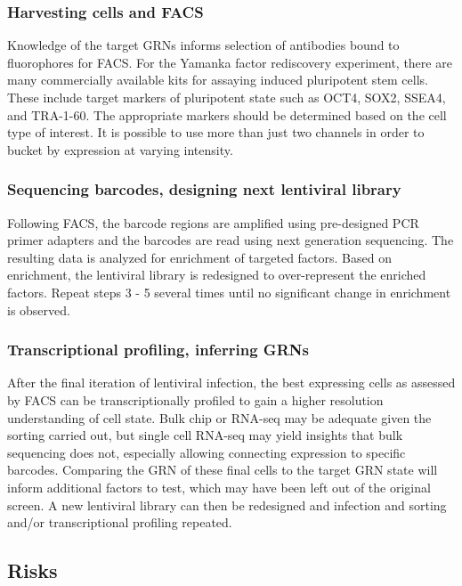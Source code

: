 \documentclass[10pt]{article}
\begin{document}
\subsubsection{Harvesting cells and FACS}

Knowledge of the target GRNs informs selection of antibodies bound to fluorophores for FACS. For the Yamanka factor rediscovery experiment, there are many commercially available kits for assaying induced pluripotent stem cells. These include target markers of pluripotent state such as OCT4, SOX2, SSEA4, and TRA-1-60. The appropriate markers should be determined based on the cell type of interest. It is possible to use more than just two channels in order to bucket by expression at varying intensity.

\subsubsection{Sequencing barcodes, designing next lentiviral library}

Following FACS, the barcode regions are amplified using pre-designed PCR primer adapters \cite{cheng2014enhanced} and the barcodes are read using next generation sequencing. The resulting data is analyzed for enrichment of targeted factors. Based on enrichment, the lentiviral library is redesigned to over-represent the enriched factors. Repeat steps 3 - 5 several times until no significant change in enrichment is observed.

\subsubsection{Transcriptional profiling, inferring GRNs}

After the final iteration of lentiviral infection, the best expressing cells as assessed by FACS can be transcriptionally profiled to gain a higher resolution understanding of cell state. Bulk chip or RNA-seq may be adequate given the sorting carried out, but single cell RNA-seq may yield insights that bulk sequencing does not, especially allowing connecting expression to specific barcodes. Comparing the GRN of these final cells to the target GRN state will inform additional factors to test, which may have been left out of the original screen. A new lentiviral library can then be redesigned and infection and sorting and/or transcriptional profiling repeated.

\subsection{Risks}
\end{document}
